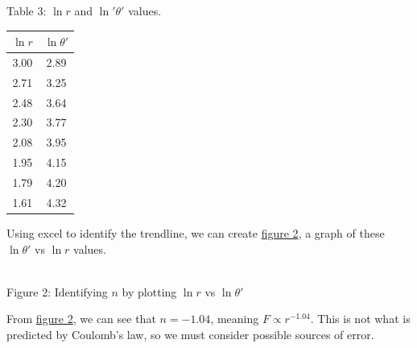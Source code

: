 \documentclass[11pt, letterpaper]{report}
\begin{document}
\begin{center}
	Table 3: $\ln r$ and $\ln '\theta '$ values.\label{tab:3}\\\vspace*{5pt}
	\begin{tabular}{c|c}
		$\ln r$&$\ln \theta '$ \\
		\hline
		3.00&2.89\\
		2.71&3.25\\
		2.48&3.64\\
		2.30&3.77\\
		2.08&3.95\\
		1.95&4.15\\
		1.79&4.20\\
		1.61&4.32
	\end{tabular}
\end{center}
Using excel to identify the trendline, we can create \hyperref[fig:2]{figure 2}, a graph of these $\ln \theta '$ vs $\ln r$ values.
\begin{center}
\\
Figure 2: Identifying $n$ by plotting $\ln r$ vs $\ln \theta '$
\end{center}

From \hyperref[fig:2]{figure 2}, we can see that $n=-1.04$, meaning $F\propto r^{-1.04}$. This is not what is predicted by Coulomb's law, so we must consider possible sources of error.
\end{document}
